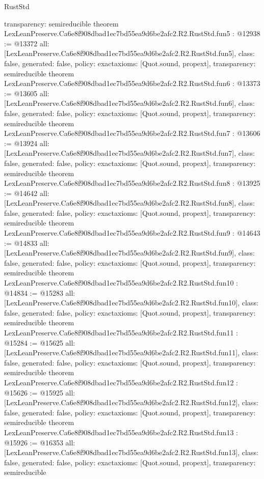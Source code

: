 \begin{lexlean}{RustStd}
\begin{coremodule}
{  transparency: semireducible
}
theorem LexLeanPreserve.Ca6e8f908dbad1ec7bd55ea9d6be2afc2.R2.RustStd.fun5 : @12938 := @13372 {
  all: [LexLeanPreserve.Ca6e8f908dbad1ec7bd55ea9d6be2afc2.R2.RustStd.fun5],
  class: false,
  generated: false,
  policy: exact{axioms: [Quot.sound, propext]},
  transparency: semireducible
}
theorem LexLeanPreserve.Ca6e8f908dbad1ec7bd55ea9d6be2afc2.R2.RustStd.fun6 : @13373 := @13605 {
  all: [LexLeanPreserve.Ca6e8f908dbad1ec7bd55ea9d6be2afc2.R2.RustStd.fun6],
  class: false,
  generated: false,
  policy: exact{axioms: [Quot.sound, propext]},
  transparency: semireducible
}
theorem LexLeanPreserve.Ca6e8f908dbad1ec7bd55ea9d6be2afc2.R2.RustStd.fun7 : @13606 := @13924 {
  all: [LexLeanPreserve.Ca6e8f908dbad1ec7bd55ea9d6be2afc2.R2.RustStd.fun7],
  class: false,
  generated: false,
  policy: exact{axioms: [Quot.sound, propext]},
  transparency: semireducible
}
theorem LexLeanPreserve.Ca6e8f908dbad1ec7bd55ea9d6be2afc2.R2.RustStd.fun8 : @13925 := @14642 {
  all: [LexLeanPreserve.Ca6e8f908dbad1ec7bd55ea9d6be2afc2.R2.RustStd.fun8],
  class: false,
  generated: false,
  policy: exact{axioms: [Quot.sound, propext]},
  transparency: semireducible
}
theorem LexLeanPreserve.Ca6e8f908dbad1ec7bd55ea9d6be2afc2.R2.RustStd.fun9 : @14643 := @14833 {
  all: [LexLeanPreserve.Ca6e8f908dbad1ec7bd55ea9d6be2afc2.R2.RustStd.fun9],
  class: false,
  generated: false,
  policy: exact{axioms: [Quot.sound, propext]},
  transparency: semireducible
}
theorem LexLeanPreserve.Ca6e8f908dbad1ec7bd55ea9d6be2afc2.R2.RustStd.fun10 : @14834 := @15283 {
  all: [LexLeanPreserve.Ca6e8f908dbad1ec7bd55ea9d6be2afc2.R2.RustStd.fun10],
  class: false,
  generated: false,
  policy: exact{axioms: [Quot.sound, propext]},
  transparency: semireducible
}
theorem LexLeanPreserve.Ca6e8f908dbad1ec7bd55ea9d6be2afc2.R2.RustStd.fun11 : @15284 := @15625 {
  all: [LexLeanPreserve.Ca6e8f908dbad1ec7bd55ea9d6be2afc2.R2.RustStd.fun11],
  class: false,
  generated: false,
  policy: exact{axioms: [Quot.sound, propext]},
  transparency: semireducible
}
theorem LexLeanPreserve.Ca6e8f908dbad1ec7bd55ea9d6be2afc2.R2.RustStd.fun12 : @15626 := @15925 {
  all: [LexLeanPreserve.Ca6e8f908dbad1ec7bd55ea9d6be2afc2.R2.RustStd.fun12],
  class: false,
  generated: false,
  policy: exact{axioms: [Quot.sound, propext]},
  transparency: semireducible
}
theorem LexLeanPreserve.Ca6e8f908dbad1ec7bd55ea9d6be2afc2.R2.RustStd.fun13 : @15926 := @16353 {
  all: [LexLeanPreserve.Ca6e8f908dbad1ec7bd55ea9d6be2afc2.R2.RustStd.fun13],
  class: false,
  generated: false,
  policy: exact{axioms: [Quot.sound, propext]},
  transparency: semireducible
}
\end{coremodule}
\end{lexlean}
